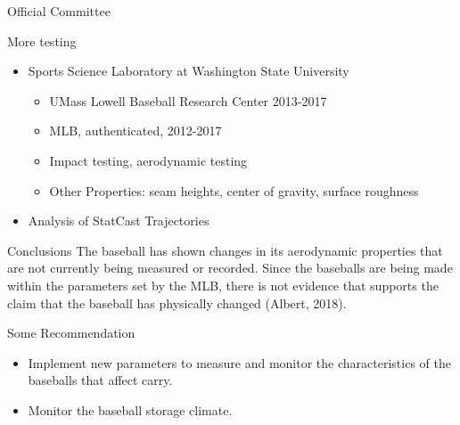 \documentclass[14pt]{bredelebeamer}
\begin{document}
\begin{frame}{Official Committee}

\begin{block}{More testing}
\begin{itemize}
\item Sports Science Laboratory at Washington State University
\begin{itemize}
\item UMass Lowell Baseball Research Center 2013-2017 
\item MLB, authenticated, 2012-2017
\item Impact testing, aerodynamic testing
\item Other Properties: seam heights, center of gravity, surface roughness
\end{itemize}
\item Analysis of StatCast Trajectories 
\end{itemize}
\end{block}
\begin{block}{Conclusions}
The baseball has shown changes in its aerodynamic properties that are not currently being measured or recorded. Since the baseballs are being made within the parameters set by the MLB, there is not evidence that supports the claim that the baseball has physically changed (Albert, 2018).
\end{block}
\begin{block}{Some Recommendation}
\begin{itemize}
\item Implement new parameters to measure and monitor the characteristics of the baseballs that affect carry.
\item Monitor the baseball storage climate.
\end{itemize}
\end{block}
\end{frame}
\end{document}

